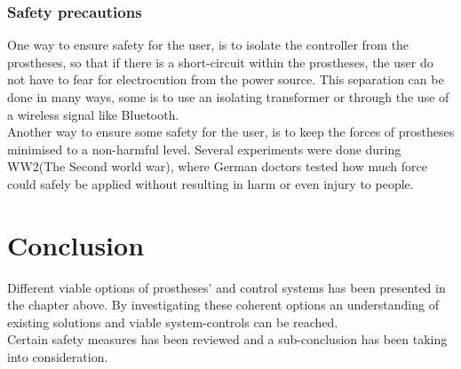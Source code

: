 \subsubsection*{Safety precautions}

One way to ensure safety for the user, is to isolate the controller from the prostheses, so that if there is a short-circuit within the prostheses, the user do not have to fear for electrocution from the power source. This separation can be done in many ways, some is to use an isolating transformer\cite{isotrans} or through the use of a wireless signal like Bluetooth.  \\
Another way to ensure some safety for the user, is to keep the forces of prostheses minimised to a non-harmful level. Several experiments were done during WW2(The Second world war), where German doctors tested how much force could safely be applied without resulting in harm or even injury to people.\\  

\section{Conclusion} %
Different viable options of prostheses' and control systems has been presented in the chapter above. By investigating these coherent options an understanding of existing solutions and viable system-controls can be reached.\\
Certain safety measures has been reviewed and a sub-conclusion has been taking into consideration. 